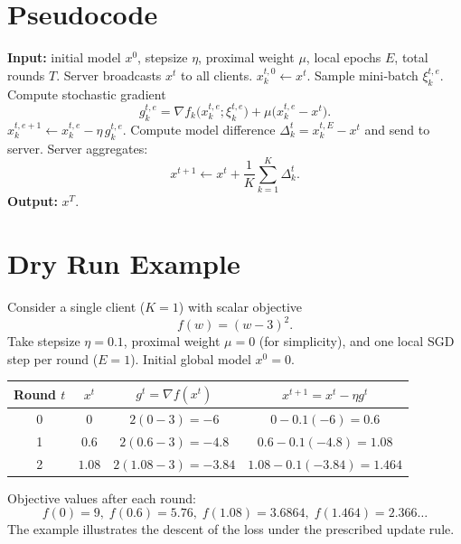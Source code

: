 \documentclass[11pt]{article}
\begin{document}
\section*{Pseudocode}
\begin{algorithm}[H]
\caption{FedProx with Local SGD}
\begin{algorithmic}[1]
\State \textbf{Input:} initial model $x^{0}$, stepsize $\eta$, proximal weight $\mu$, local epochs $E$, total rounds $T$.
    \State Server broadcasts $x^{t}$ to all clients.
        \State $x_{k}^{t,0}\gets x^{t}$.
            \State Sample mini‑batch $\xi_{k}^{t,e}$.
            \State Compute stochastic gradient 
            \[
                g_{k}^{t,e}= \nabla f_k\!\bigl(x_{k}^{t,e};\xi_{k}^{t,e}\bigr)+\mu\bigl(x_{k}^{t,e}-x^{t}\bigr).
            \]
            \State $x_{k}^{t,e+1}\gets x_{k}^{t,e}-\eta\,g_{k}^{t,e}$.
        \EndFor
        \State Compute model difference $\Delta_{k}^{t}=x_{k}^{t,E}-x^{t}$ and send to server.
    \EndFor
    \State Server aggregates:
    \[
        x^{t+1}\gets x^{t}+\frac{1}{K}\sum_{k=1}^{K}\Delta_{k}^{t}.
    \]
\EndFor
\State \textbf{Output:} $x^{T}$.
\end{algorithmic}
\end{algorithm}

\section*{Dry Run Example}
Consider a single client ($K=1$) with scalar objective
\[
    f(w)=(w-3)^{2}.
\]
Take stepsize $\eta=0.1$, proximal weight $\mu=0$ (for simplicity), and one local SGD step per round ($E=1$).  
Initial global model $x^{0}=0$.

\begin{center}
\begin{tabular}{c|c|c|c}
\textbf{Round $t$} & $x^{t}$ & $g^{t}= \nabla f(x^{t})$ & $x^{t+1}=x^{t}-\eta g^{t}$ \\ \hline
0 & $0$ & $2(0-3)=-6$ & $0-0.1(-6)=0.6$ \\ 
1 & $0.6$ & $2(0.6-3)=-4.8$ & $0.6-0.1(-4.8)=1.08$ \\ 
2 & $1.08$ & $2(1.08-3)=-3.84$ & $1.08-0.1(-3.84)=1.464$ \\ 
\end{tabular}
\end{center}
Objective values after each round:
\[
    f(0)=9,\;
    f(0.6)=5.76,\;
    f(1.08)=3.6864,\;
    f(1.464)=2.366\ldots
\]
The example illustrates the descent of the loss under the prescribed update rule.
\end{document}
